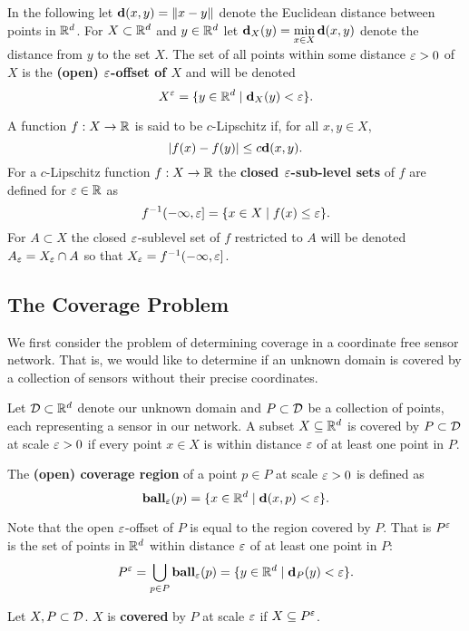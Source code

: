 
In the following let $\mathbf{d}(x,y) = \| x - y\|$ denote the Euclidean distance between points in $\mathbb{R}^d$.
For $X\subset\mathbb{R}^d$ and $y\in\mathbb{R}^d$ let $\mathbf{d}_X(y) = \displaystyle\min_{x\in X}\mathbf{d}(x, y)$ denote the distance from $y$ to the set $X$.
The set of all points within some distance $\varepsilon > 0$ of $X$ is the \textbf{(open) $\varepsilon$-offset of $X$} and will be denoted
\[ X^\varepsilon = \{ y\in\mathbb{R}^d\mid \mathbf{d}_X(y) < \varepsilon\}. \]

A function $f : X\to\mathbb{R}$ is said to be $c$-Lipschitz if, for all $x,y\in X$,
\[ | f(x) - f(y) | \leq c\mathbf{d}(x, y).\]
For a $c$-Lipschitz function $f : X\to\mathbb{R}$ the \textbf{closed $\varepsilon$-sub-level sets} of $f$ are defined for $\varepsilon\in\mathbb{R}$ as
\[ f^{-1}(-\infty,\varepsilon] = \{x\in X\mid f(x) \leq \varepsilon\}.\]
For $A\subset X$ the closed $\varepsilon$-sublevel set of $f$ restricted to $A$ will be denoted $A_\varepsilon = X_\varepsilon \cap A$ so that $X_\varepsilon = f^{-1}(-\infty,\varepsilon]$.

\subsection{The Coverage Problem}\label{sec:coverage}

We first consider the problem of determining coverage in a coordinate free sensor network.
That is, we would like to determine if an unknown domain is covered by a collection of sensors without their precise coordinates.

Let ${\mathcal{D}}\subset\mathbb{R}^d$ denote our unknown domain and $P\subset{\mathcal{D}}$ be a collection of points, each representing a sensor in our network.
A subset $X\subseteq\mathbb{R}^d$ is covered by $P\subset{\mathcal{D}}$ at scale $\varepsilon > 0$ if every point $x\in X$ is within distance $\varepsilon$ of at least one point in $P$.
\begin{definition}
    The \textbf{(open) coverage region} of a point $p\in P$ at scale $\varepsilon > 0$ is defined as
    \[ \mathbf{ball}_\varepsilon(p) = \{x\in\mathbb{R}^d\mid \mathbf{d}(x, p) < \varepsilon \}. \]
\end{definition}
Note that the open $\varepsilon$-offset of $P$ is equal to the region covered by $P$.
That is $P^\varepsilon$ is the set of points in $\mathbb{R}^d$ within distance $\varepsilon$ of at least one point in $P$:
\[ P^\varepsilon = \bigcup_{p\in P}\mathbf{ball}_\varepsilon(p) = \{ y\in\mathbb{R}^d\mid \mathbf{d}_P(y) < \varepsilon\}.\]
\begin{definition}
    Let $X, P\subset{\mathcal{D}}$.
    $X$ is \textbf{covered} by $P$ at scale $\varepsilon$ if $X\subseteq P^\varepsilon$.
\end{definition}


